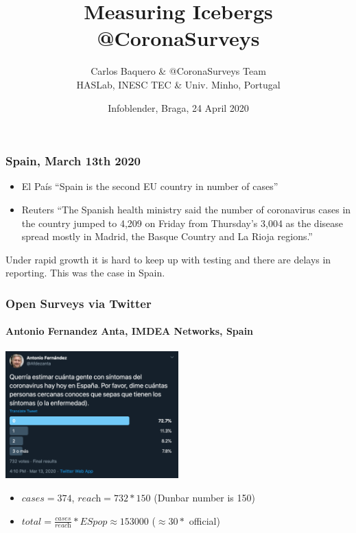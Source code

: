 \documentclass{beamer}
\title{Measuring Icebergs @CoronaSurveys}
\author{Carlos Baquero \& @CoronaSurveys Team\\
\vspace{8pt}HASLab, INESC TEC \& Univ. Minho, Portugal}
\date{Infoblender, Braga,  24 April 2020}
\begin{document}

\begin{frame}
  \frametitle{Spain, March 13th 2020}

  \begin{itemize}
    \item El País ``Spain is the second EU country in number of cases''

    \item Reuters ``The Spanish health ministry said the number of coronavirus cases in the country jumped to 4,209 on Friday from Thursday's 3,004 as the disease spread mostly in Madrid, the Basque Country and La Rioja regions.''
  \end{itemize}

  Under rapid growth it is hard to keep up with testing and there are delays in reporting. This was the case in Spain.

\end{frame}

\begin{frame}
  \frametitle{Open Surveys via Twitter}
  \framesubtitle{Antonio Fernandez Anta, IMDEA Networks, Spain}
  \begin{center}
  \includegraphics[width=0.5\textwidth]{Twitter.png}
  \end{center}
  \begin{itemize}
    \item $\textit{cases}=374$, $\textit{reach}=732*150$ \hfill (Dunbar number is 150)
    \item $\textit{total}=\frac{\textit{cases}}{\textit{reach}}*\textit{ESpop} \approx 153000 $ \hfill ($\approx 30*$ official)
  \end{itemize}
\end{frame}
\end{document}
